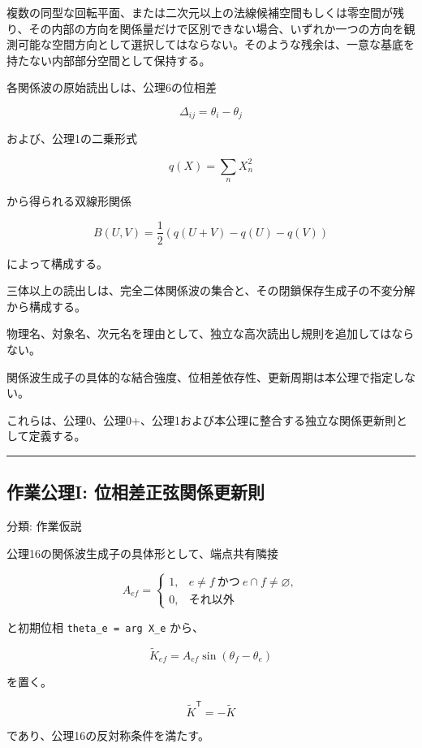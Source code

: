 \documentclass[
  a4paper,
]{ltjsarticle}
\begin{document}
複数の同型な回転平面、または二次元以上の法線候補空間もしくは零空間が残り、その内部の方向を関係量だけで区別できない場合、いずれか一つの方向を観測可能な空間方向として選択してはならない。そのような残余は、一意な基底を持たない内部部分空間として保持する。

各関係波の原始読出しは、公理6の位相差

\[
\Delta_{ij}=\theta_i-\theta_j
\]

および、公理1の二乗形式

\[
q(X)=\sum_n X_n^2
\]

から得られる双線形関係

\[
B(U,V)
=\frac{1}{2}\left(q(U+V)-q(U)-q(V)\right)
\]

によって構成する。

三体以上の読出しは、完全二体関係波の集合と、その閉鎖保存生成子の不変分解から構成する。

物理名、対象名、次元名を理由として、独立な高次読出し規則を追加してはならない。

関係波生成子の具体的な結合強度、位相差依存性、更新周期は本公理で指定しない。

これらは、公理0、公理0+、公理1および本公理に整合する独立な関係更新則として定義する。

\begin{center}\rule{0.5\linewidth}{0.5pt}\end{center}

\subsection{作業公理I:
位相差正弦関係更新則}\label{ux4f5cux696dux516cux7406i-ux4f4dux76f8ux5deeux6b63ux5f26ux95a2ux4fc2ux66f4ux65b0ux5247}

分類: 作業仮説

公理16の関係波生成子の具体形として、端点共有隣接

\[
A_{ef}
=
\begin{cases}
1,& e\ne f\ \text{かつ}\ e\cap f\ne\varnothing,\\
0,& \text{それ以外}
\end{cases}
\]

と初期位相 \texttt{theta\_e\ =\ arg\ X\_e} から、

\[
\widetilde K_{ef}
=
A_{ef}\sin(\theta_f-\theta_e)
\]

を置く。

\[
\widetilde K^{\mathsf T}=-\widetilde K
\]

であり、公理16の反対称条件を満たす。
\end{document}
